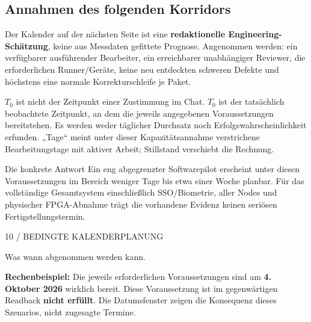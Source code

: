 \begin{cols}
\subsection*{Annahmen des folgenden Korridors}
Der Kalender auf der nächsten Seite ist eine \textbf{redaktionelle Engineering-Schätzung}, keine aus Messdaten gefittete Prognose. Angenommen werden: ein verfügbarer ausführender Bearbeiter, ein erreichbarer unabhängiger Reviewer, die erforderlichen Runner/Geräte, keine neu entdeckten schweren Defekte und höchstens eine normale Korrekturschleife je Paket.

$T_0$ ist nicht der Zeitpunkt einer Zustimmung im Chat. $T_0$ ist der tatsächlich beobachtete Zeitpunkt, an dem die jeweils angegebenen Voraussetzungen bereitstehen. Es werden weder täglicher Durchsatz noch Erfolgswahrscheinlichkeit erfunden. „Tage“ meint unter dieser Kapazitätsannahme verstrichene Bearbeitungstage mit aktiver Arbeit; Stillstand verschiebt die Rechnung.

\begin{boundary}{Die konkrete Antwort}
Ein eng abgegrenzter Softwarepilot erscheint unter diesen Voraussetzungen im Bereich weniger Tage bis etwa einer Woche planbar. Für das vollständige Gesamtsystem einschließlich SSO/Biometrie, aller Nodes und physischer FPGA-Abnahme trägt die vorhandene Evidenz keinen seriösen Fertigstellungstermin.
\end{boundary}
\end{cols}
\clearpage{}
{\sffamily\small\color{Accent}10 / BEDINGTE KALENDERPLANUNG}\par\vspace{4mm}
{\fontsize{24}{29}\selectfont Was wann abgenommen werden kann.}\par\vspace{4mm}
\textbf{Rechenbeispiel:} Die jeweils erforderlichen Voraussetzungen sind am \textbf{4. Oktober 2026} wirklich bereit. Diese Voraussetzung ist im gegenwärtigen Readback \textbf{nicht erfüllt}. Die Datumsfenster zeigen die Konsequenz dieses Szenarios, nicht zugesagte Termine.
\vspace{4mm}
\par
